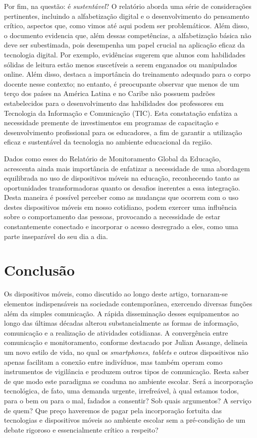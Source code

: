 \documentclass[portuguese]{textolivre}
\begin{document}
Por fim, na questão: é \textit{sustentável}? O relatório aborda uma série de considerações pertinentes, incluindo a alfabetização digital e o desenvolvimento do pensamento crítico, aspectos que, como vimos até aqui podem ser problemáticos. Além disso, o documento evidencia que, além dessas competências, a alfabetização básica não deve ser subestimada, pois desempenha um papel crucial na aplicação eficaz da tecnologia digital. Por exemplo, evidências sugerem que alunos com habilidades sólidas de leitura estão menos suscetíveis a serem enganados ou manipulados online. Além disso, destaca a importância do treinamento adequado para o corpo docente nesse contexto; no entanto, é preocupante observar que menos de um terço dos países na América Latina e no Caribe não possuem padrões estabelecidos para o desenvolvimento das habilidades dos professores em Tecnologia da Informação e Comunicação (TIC). Esta constatação enfatiza a necessidade premente de investimentos em programas de capacitação e desenvolvimento profissional para os educadores, a fim de garantir a utilização eficaz e sustentável da tecnologia no ambiente educacional da região.

Dados como esses do Relatório de Monitoramento Global da Educação, acrescenta ainda mais importância de enfatizar a necessidade de uma abordagem equilibrada no uso de dispositivos móveis na educação, reconhecendo tanto as oportunidades transformadoras quanto os desafios inerentes a essa integração.
Desta maneira é possível perceber como as mudanças que ocorrem com o uso destes dispositivos móveis em nosso cotidiano, podem exercer uma influência sobre o comportamento das pessoas, provocando a necessidade de estar constantemente conectado e incorporar o acesso desregrado a eles, como uma parte inseparável do seu dia a dia.

\section{Conclusão}\label{sec-modelo}
Os dispositivos móveis, como discutido ao longo deste artigo, tornaram-se elementos indispensáveis na sociedade contemporânea, exercendo diversas funções além da simples comunicação. A rápida disseminação desses equipamentos ao longo das últimas décadas alterou substancialmente as formas de informação, comunicação e a realização de atividades cotidianas. A convergência entre comunicação e monitoramento, conforme destacado por Julian Assange, delineia um novo estilo de vida, no qual os \textit{smartphones}, \textit{tablets} e outros dispositivos não apenas facilitam a conexão entre indivíduos, mas também operam como instrumentos de vigilância e produzem outros tipos de comunicação. Resta saber de que modo este paradigma se coaduna no ambiente escolar. Será a incorporação tecnológica, de fato, uma demanda urgente, irrefreável, à qual estamos todos, para o bem ou para o mal, fadados a consentir? Sob quais argumentos? A serviço de quem? Que preço haveremos de pagar pela incorporação fortuita das tecnologias e dispositivos móveis ao ambiente escolar sem a pré-condição de um debate rigoroso e essencialmente crítico a respeito?
\end{document}
